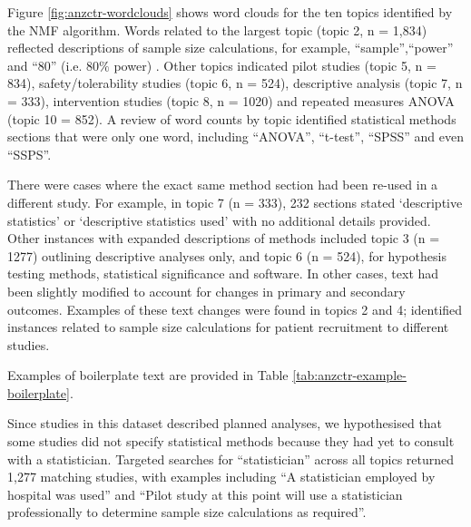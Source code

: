 \documentclass[12pt]{article}
\begin{document}
Figure \ref{fig:anzctr-wordclouds} shows word clouds for the ten topics identified by the NMF algorithm. 
Words related to the largest topic (topic 2, n = 1,834) reflected descriptions of sample size calculations, for example, ``sample'',``power'' and ``80'' (i.e. $80\%$ power) . Other topics indicated pilot studies (topic 5, n = 834),
safety/tolerability studies (topic 6, n = 524), descriptive analysis (topic 7, n = 333),
intervention studies (topic 8, n = 1020) and repeated measures ANOVA (topic 10 = 852). A review of word counts by topic 
identified statistical methods sections that were only one word, including ``ANOVA'',
``t-test'', ``SPSS'' and even ``SSPS''. 


There were cases where the exact
same method section had been re-used in a different study. For example,
in topic 7 (n = 333), 232 sections stated `descriptive statistics' or
`descriptive statistics used' with no additional details provided. Other
instances with expanded descriptions of methods included topic 3 (n =
1277) outlining descriptive analyses only, and topic 6 (n = 524), for
hypothesis testing methods, statistical significance and software. 
In other cases, text had been slightly modified to account for changes
in primary and secondary outcomes. Examples of these text changes were
found in topics 2 and 4; identified instances
related to sample size calculations for patient recruitment to different
studies.

Examples of boilerplate text are provided in Table
\ref{tab:anzctr-example-boilerplate}.

Since studies in this dataset described planned analyses, we
hypothesised that some studies did not specify statistical methods because
they had yet to consult with a statistician. Targeted searches for ``statistician'' across all topics returned 1,277 matching studies,
with examples including ``A statistician employed by hospital was used''
and ``Pilot study at this point will use a statistician professionally
to determine sample size calculations as required''.
\end{document}
